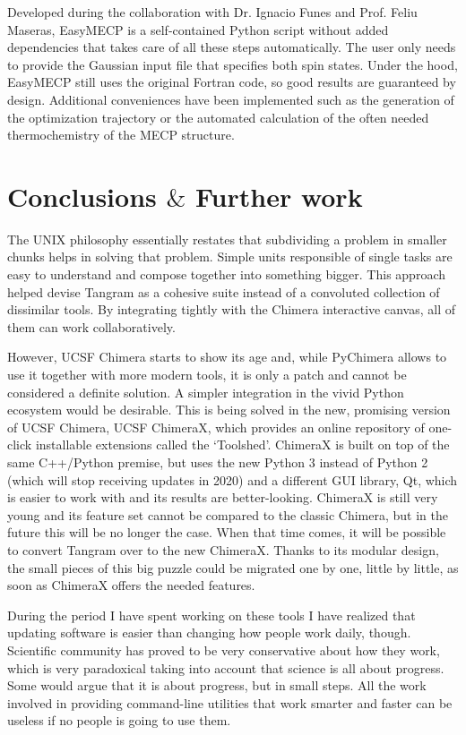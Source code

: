 Developed during the collaboration with Dr. Ignacio Funes and Prof. Feliu Maseras, EasyMECP is a self-contained Python script without added dependencies that takes care of all these steps automatically. The user only needs to provide the Gaussian input file that specifies both spin states. Under the hood, EasyMECP still uses the original Fortran code, so good results are guaranteed by design. Additional conveniences have been implemented such as the generation of the optimization trajectory or the automated calculation of the often needed thermochemistry of the MECP structure.

\section{Conclusions $\&$  Further work}
The UNIX philosophy essentially restates that subdividing a problem in smaller chunks helps in solving that problem. Simple units responsible of single tasks are easy to understand and compose together into something bigger. This approach helped devise Tangram as a cohesive suite instead of a convoluted collection of dissimilar tools. By integrating tightly with the Chimera interactive canvas, all of them can work collaboratively.

However, UCSF Chimera starts to show its age and, while PyChimera allows to use it together with more modern tools, it is only a patch and cannot be considered a definite solution. A simpler integration in the vivid Python ecosystem would be desirable. This is being solved in the new, promising version of UCSF Chimera, UCSF ChimeraX,\cite{chimerax} which provides an online repository of one-click installable extensions called the ‘Toolshed’. ChimeraX is built on top of the same C++/Python premise, but uses the new Python 3 instead of Python 2 (which will stop receiving updates in 2020) and a different GUI library, Qt, which is easier to work with and its results are better-looking. ChimeraX is still very young and its feature set cannot be compared to the classic Chimera, but in the future this will be no longer the case. When that time comes, it will be possible to convert Tangram over to the new ChimeraX. Thanks to its modular design, the small pieces of this big puzzle could be migrated one by one, little by little, as soon as ChimeraX offers the needed features.

During the period I have spent working on these tools I have realized that updating software is easier than changing how people work daily, though. Scientific community has proved to be very conservative about how they work, which is very paradoxical taking into account that science is all about progress. Some would argue that it is about progress, but in small steps. All the work involved in providing command-line utilities that work smarter and faster can be useless if no people is going to use them.

